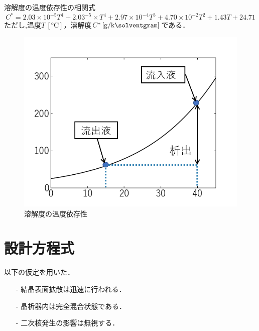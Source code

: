 \documentclass[a4j]{jsreport}
\begin{document}
\noindent 溶解度の温度依存性の相関式
\begin{equation}
    C^*=2.03\times 10^{-5}T^4 +2.03^{-5}\times T^4 + 2.97\times 10^{-4}T^3 + 4.70\times 10^{-2}T^2 + 1.43T + 24.71
\end{equation}
ただし,温度$T \, [\si{\degreeCelsius}]$，溶解度$C^* \, [\si{\gram \per \kilo \solventgram}]$である．
\begin{figure}[htbp]
  \centering
  \includegraphics[scale=0.7]{BzAsolvent.png}
  \caption{溶解度の温度依存性}
  \label{溶解度の温度依存性}
\end{figure}

\section{設計方程式}
以下の仮定を用いた．
\begin{itemize}
    \setlength{\parskip}{0pt}
    \setlength{\itemsep}{2pt}
    \item[-] 結晶表面拡散は迅速に行われる．
    \item[-] 晶析器内は完全混合状態である．
    \item[-] 二次核発生の影響は無視する．
\end{itemize}
\end{document}
